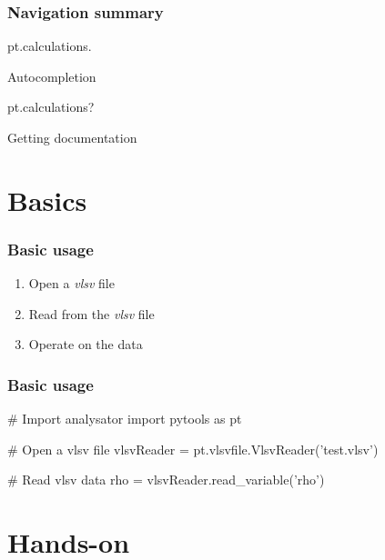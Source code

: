 \documentclass{beamer}
\begin{document}
\begin{frame}[fragile]
 \frametitle{Navigation summary}
 \begin{python}[basicstyle=\tiny]
  pt.calculations.
 \end{python}
  Autocompletion
 \begin{python}[basicstyle=\tiny]
  pt.calculations?
 \end{python}
  Getting documentation
\end{frame}


\section{Basics}

\begin{frame}
 \frametitle{Basic usage}
 \begin{enumerate}
  \item Open a \emph{vlsv} file
  \item Read from the \emph{vlsv} file
  \item Operate on the data
 \end{enumerate}
\end{frame}

\begin{frame}[fragile]
 \frametitle{Basic usage}
 \begin{python}[basicstyle=\tiny]
  # Import analysator
  import pytools as pt
  
  # Open a vlsv file
  vlsvReader = pt.vlsvfile.VlsvReader('test.vlsv')
  
  # Read vlsv data
  rho = vlsvReader.read_variable('rho')
  
 \end{python}

\end{frame}


\section{Hands-on}
\end{document}
